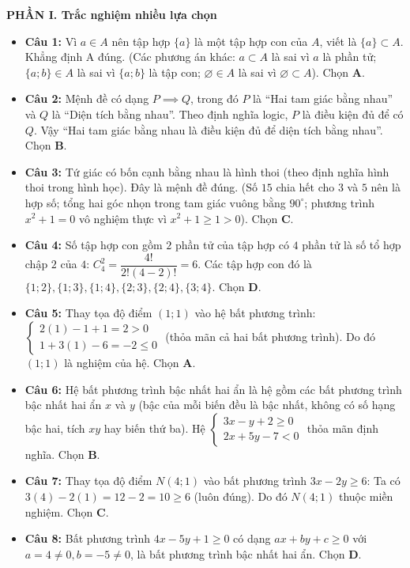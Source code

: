 \documentclass[12pt,a4paper]{article}
\begin{document}
\textbf{PHẦN I. Trắc nghiệm nhiều lựa chọn}
\begin{itemize}[leftmargin=0.6cm, itemsep=3pt]
    \item \textbf{Câu 1:} Vì $a \in A$ nên tập hợp $\{a\}$ là một tập hợp con của $A$, viết là $\{a\} \subset A$. Khẳng định A đúng. (Các phương án khác: $a \subset A$ là sai vì $a$ là phần tử; $\{a; b\} \in A$ là sai vì $\{a; b\}$ là tập con; $\varnothing \in A$ là sai vì $\varnothing \subset A$). Chọn \textbf{A}.
    \item \textbf{Câu 2:} Mệnh đề có dạng $P \implies Q$, trong đó $P$ là ``Hai tam giác bằng nhau'' và $Q$ là ``Diện tích bằng nhau''. Theo định nghĩa logic, $P$ là điều kiện đủ để có $Q$. Vậy ``Hai tam giác bằng nhau là điều kiện đủ để diện tích bằng nhau''. Chọn \textbf{B}.
    \item \textbf{Câu 3:} Tứ giác có bốn cạnh bằng nhau là hình thoi (theo định nghĩa hình thoi trong hình học). Đây là mệnh đề đúng. (Số $15$ chia hết cho $3$ và $5$ nên là hợp số; tổng hai góc nhọn trong tam giác vuông bằng $90^\circ$; phương trình $x^2 + 1 = 0$ vô nghiệm thực vì $x^2 + 1 \ge 1 > 0$). Chọn \textbf{C}.
    \item \textbf{Câu 4:} Số tập hợp con gồm $2$ phần tử của tập hợp có $4$ phần tử là số tổ hợp chập $2$ của $4$: $C_4^2 = \dfrac{4!}{2!(4-2)!} = 6$. Các tập hợp con đó là $\{1; 2\}, \{1; 3\}, \{1; 4\}, \{2; 3\}, \{2; 4\}, \{3; 4\}$. Chọn \textbf{D}.
    \item \textbf{Câu 5:} Thay tọa độ điểm $(1; 1)$ vào hệ bất phương trình:
    $\begin{cases} 2(1) - 1 + 1 = 2 > 0 \\ 1 + 3(1) - 6 = -2 \le 0 \end{cases}$ (thỏa mãn cả hai bất phương trình). Do đó $(1; 1)$ là nghiệm của hệ. Chọn \textbf{A}.
    \item \textbf{Câu 6:} Hệ bất phương trình bậc nhất hai ẩn là hệ gồm các bất phương trình bậc nhất hai ẩn $x$ và $y$ (bậc của mỗi biến đều là bậc nhất, không có số hạng bậc hai, tích $xy$ hay biến thứ ba). Hệ $\begin{cases} 3x - y + 2 \ge 0 \\ 2x + 5y - 7 < 0 \end{cases}$ thỏa mãn định nghĩa. Chọn \textbf{B}.
    \item \textbf{Câu 7:} Thay tọa độ điểm $N(4; 1)$ vào bất phương trình $3x - 2y \ge 6$:
    Ta có $3(4) - 2(1) = 12 - 2 = 10 \ge 6$ (luôn đúng). Do đó $N(4; 1)$ thuộc miền nghiệm. Chọn \textbf{C}.
    \item \textbf{Câu 8:} Bất phương trình $4x - 5y + 1 \ge 0$ có dạng $ax + by + c \ge 0$ với $a = 4 \ne 0, b = -5 \ne 0$, là bất phương trình bậc nhất hai ẩn. Chọn \textbf{D}.

\end{itemize}
\end{document}
